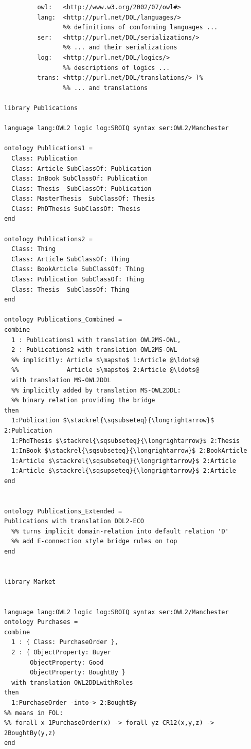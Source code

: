 \documentclass[10pt,fleqn,final]{scrreprt}
\begin{document}
\begin{lstlisting}[basicstyle=\ttfamily,language=dolText,morekeywords={props,ObjectProperty,Class,DisjointUnionOf,SubClassOf,Characteristics,Transitive,Asymmetric,SubPropertyOf,DisjointClasses,EquivalentTo,inverse,only,forall,iff,if,or,exists,distributed},escapechar=@,mathescape]
%prefix( :      <http://www.example.org/mereology#>
         owl:   <http://www.w3.org/2002/07/owl#>
         lang:  <http://purl.net/DOL/languages/>
                %% definitions of conforming languages ...
         ser:   <http://purl.net/DOL/serializations/>
                %% ... and their serializations
         log:   <http://purl.net/DOL/logics/>
                %% descriptions of logics ...
         trans: <http://purl.net/DOL/translations/> )%
                %% ... and translations

library Publications

language lang:OWL2 logic log:SROIQ syntax ser:OWL2/Manchester

ontology Publications1 =
  Class: Publication
  Class: Article SubClassOf: Publication
  Class: InBook SubClassOf: Publication
  Class: Thesis  SubClassOf: Publication
  Class: MasterThesis  SubClassOf: Thesis
  Class: PhDThesis SubClassOf: Thesis
end

ontology Publications2 =
  Class: Thing
  Class: Article SubClassOf: Thing
  Class: BookArticle SubClassOf: Thing
  Class: Publication SubClassOf: Thing
  Class: Thesis  SubClassOf: Thing
end

ontology Publications_Combined =
combine
  1 : Publications1 with translation OWL2MS-OWL,
  2 : Publications2 with translation OWL2MS-OWL
  %% implicitly: Article $\mapsto$ 1:Article @\ldots@
  %%             Article $\mapsto$ 2:Article @\ldots@  
  with translation MS-OWL2DDL
  %% implicitly added by translation MS-OWL2DDL: 
  %% binary relation providing the bridge
then
  1:Publication $\stackrel{\sqsubseteq}{\longrightarrow}$ 2:Publication
  1:PhdThesis $\stackrel{\sqsubseteq}{\longrightarrow}$ 2:Thesis
  1:InBook $\stackrel{\sqsubseteq}{\longrightarrow}$ 2:BookArticle
  1:Article $\stackrel{\sqsubseteq}{\longrightarrow}$ 2:Article
  1:Article $\stackrel{\sqsupseteq}{\longrightarrow}$ 2:Article
end


ontology Publications_Extended =
Publications with translation DDL2-ECO
  %% turns implicit domain-relation into default relation 'D'
  %% add E-connection style bridge rules on top
end


library Market


language lang:OWL2 logic log:SROIQ syntax ser:OWL2/Manchester
ontology Purchases =
combine
  1 : { Class: PurchaseOrder },
  2 : { ObjectProperty: Buyer
       ObjectProperty: Good
       ObjectProperty: BoughtBy }
  with translation OWL2DDLwithRoles
then
  1:PurchaseOrder -into-> 2:BoughtBy
%% means in FOL: 
%% forall x 1PurchaseOrder(x) -> forall yz CR12(x,y,z) -> 2BoughtBy(y,z)
end


\end{lstlisting}
\end{document}
